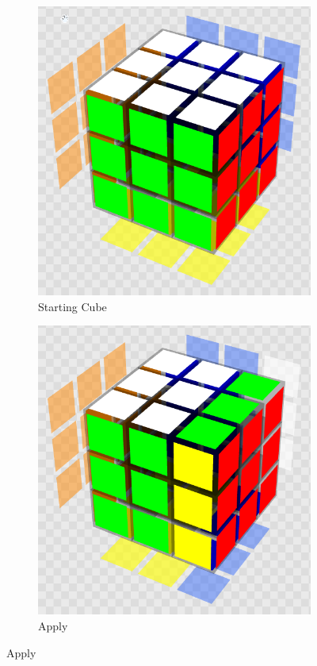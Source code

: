 \begin{figure}[h]
    \centering
    \caption{The move sequence }
    \label{fig:notation-demo}
    \begin{subfigure}{0.25\textwidth}
        \centering
        \caption{Starting Cube}
        \label{fig:notation-demo-start}
        \includegraphics[width=.90\linewidth]{Figures/2 Background/start.png}
    \end{subfigure}%
    \begin{subfigure}{0.25\textwidth}
        \centering
        \caption{Apply }
        \label{fig:notation-demo-r}
        \includegraphics[width=.90\linewidth]{Figures/2 Background/R.png}

\end{subfigure}
\end{figure}
